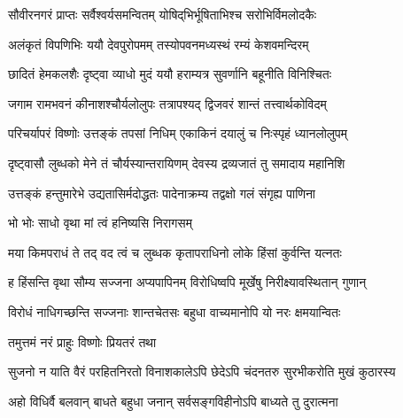 \twolineshloka
{सौवीरनगरं प्राप्तः सर्वैश्वर्यसमन्वितम्}
{योषिद्‌भिर्भूषिताभिश्च सरोभिर्विमलोदकैः}%

 

\twolineshloka
{अलंकृतं विपणिभिः ययौ देवपुरोपमम्}
{तस्योपवनमध्यस्थं रम्यं केशवमन्दिरम्}%

 

\twolineshloka
{छादितं हेमकलशैः दृष्ट्वा व्याधो मुदं ययौ}
{हराम्यत्र सुवर्णानि बहूनीति विनिश्चितः}%

 

\twolineshloka
{जगाम रामभवनं कीनाशश्चौर्यलोलुपः}
{तत्रापश्यद् द्विजवरं शान्तं तत्त्वार्थकोविदम्}%

 

\twolineshloka
{परिचर्यापरं विष्णोः उत्तङ्कं तपसां निधिम्}
{एकाकिनं दयालुं च निःस्पृहं ध्यानलोलुपम्}%

 

\twolineshloka
{दृष्ट्वासौ लुब्धको मेने तं चौर्यस्यान्तरायिणम्}
{देवस्य द्रव्यजातं तु समादाय महानिशि}%

 

\twolineshloka
{उत्तङ्कं हन्तुमारेभे उद्यतासिर्मदोद्धतः}
{पादेनाक्रम्य तद्वक्षो गलं संगृह्य पाणिना}%

 



\onelineshloka
{भो भोः साधो वृथा मां त्वं हनिष्यसि निरागसम्}%

 

\twolineshloka
{मया किमपराधं ते तद् वद त्वं च लुब्धक}
{कृतापराधिनो लोके हिंसां कुर्वन्ति यत्‍नतः}%

 

\twolineshloka
{ह हिंसन्ति वृथा सौम्य सज्जना अप्यपापिनम्}
{विरोधिष्वपि मूर्खेषु निरीक्ष्यावस्थितान् गुणान्}%

 

\twolineshloka
{विरोधं नाधिगच्छन्ति सज्जनाः शान्तचेतसः}
{बहुधा वाच्यमानोपि यो नरः क्षमयान्वितः}%

 
\onelineshloka
{तमुत्तमं नरं प्राहुः विष्णोः प्रियतरं तथा}%

 

\twolineshloka
{सुजनो न याति वैरं परहितनिरतो विनाशकालेऽपि}
{छेदेऽपि चंदनतरु सुरभीकरोति मुखं कुठारस्य}%

 

\twolineshloka
{अहो विधिर्वै बलवान् बाधते बहुधा जनान्}
{सर्वसङ्‌‍गविहीनोऽपि बाध्यते तु दुरात्मना}%

